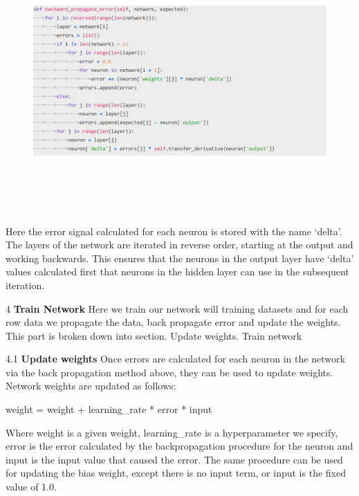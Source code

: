 { \begin{figure}[H]
\begin{center}
\includegraphics[width=160mm,height=100mm]{backexplain/errorback.jpg}
\end{center}
\end{figure} 

Here the error signal calculated for each neuron is stored with the name ‘delta’. The layers of the network are iterated in reverse order, starting at the output and working backwards. This ensures that the neurons in the output layer have ‘delta’ values calculated first that neurons in the hidden layer can use in the subsequent iteration.


4 \textbf{Train Network}
Here we train our network will training datasets and for each row data we propagate the data, back propagate error and update the weights.
 This part is broken down into section. Update weights. Train network


4.1 \textbf{Update weights}
Once errors are calculated for each neuron in the network via the back propagation method above, they can be used to update weights.\newline
Network weights are updated as follows:\newline
\centerline{weight = weight + learning\_rate * error * input}
Where weight is a given weight, learning\_rate is a hyperparameter we specify, error is the error calculated by the backpropagation procedure for the neuron and input is the input value that caused the error.
The same procedure can be used for updating the bias weight, except there is no input term, or input is the fixed value of 1.0.

}

